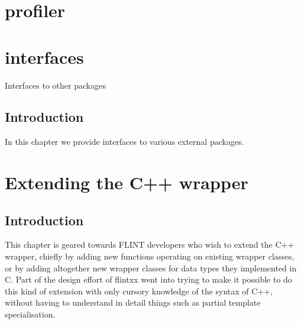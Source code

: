 \documentclass[a4paper,10pt]{book}
\begin{document}
{{


\chapter{profiler}




\chapter{interfaces}
\epigraph{Interfaces to other packages}{}

\section{Introduction}

In this chapter we provide interfaces to various external packages.



\appendix
\chapter{Extending the C++ wrapper}
\label{app:genericxx}

\section{Introduction}

This chapter is geared towards FLINT developers who wish to extend the C++
wrapper, chiefly by adding new functions operating on existing wrapper classes,
or by adding altogether new wrapper classes for data types they implemented in
C. Part of the design effort of flintxx went into trying to make it possible to
do this kind of extension with only cursory knowledge of the syntax of C++,
without having to understand in detail things such as partial template
specialisation.

}}
\end{document}
